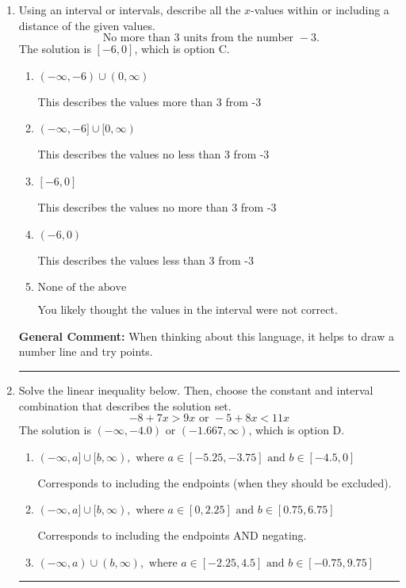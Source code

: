\documentclass{extbook}[14pt]
\newcommand{\litem}[1]{\item #1

\rule{\textwidth}{0.4pt}}
\begin{document}
\begin{enumerate}
{\begin{enumerate}[label=\Alph*.]
You may have chosen this if you thought the inequality did not match the ends of the intervals.
\end{enumerate}

\textbf{General Comment:} Remember that less/greater than or equal to includes the endpoint, while less/greater do not. Also, remember that you need to flip the inequality when you multiply or divide by a negative.
}
\litem{
Using an interval or intervals, describe all the $x$-values within or including a distance of the given values.
\[ \text{ No more than } 3 \text{ units from the number } -3. \]The solution is \( [-6, 0] \), which is option C.\begin{enumerate}[label=\Alph*.]
\item \( (-\infty, -6) \cup (0, \infty) \)

This describes the values more than 3 from -3
\item \( (-\infty, -6] \cup [0, \infty) \)

This describes the values no less than 3 from -3
\item \( [-6, 0] \)

This describes the values no more than 3 from -3
\item \( (-6, 0) \)

This describes the values less than 3 from -3
\item \( \text{None of the above} \)

You likely thought the values in the interval were not correct.
\end{enumerate}

\textbf{General Comment:} When thinking about this language, it helps to draw a number line and try points.
}
\litem{
Solve the linear inequality below. Then, choose the constant and interval combination that describes the solution set.
\[ -8 + 7 x > 9 x \text{ or } -5 + 8 x < 11 x \]The solution is \( (-\infty, -4.0) \text{ or } (-1.667, \infty) \), which is option D.\begin{enumerate}[label=\Alph*.]
\item \( (-\infty, a] \cup [b, \infty), \text{ where } a \in [-5.25, -3.75] \text{ and } b \in [-4.5, 0] \)

Corresponds to including the endpoints (when they should be excluded).
\item \( (-\infty, a] \cup [b, \infty), \text{ where } a \in [0, 2.25] \text{ and } b \in [0.75, 6.75] \)

Corresponds to including the endpoints AND negating.
\item \( (-\infty, a) \cup (b, \infty), \text{ where } a \in [-2.25, 4.5] \text{ and } b \in [-0.75, 9.75] \)


\end{enumerate}}
\end{enumerate}
\end{document}
